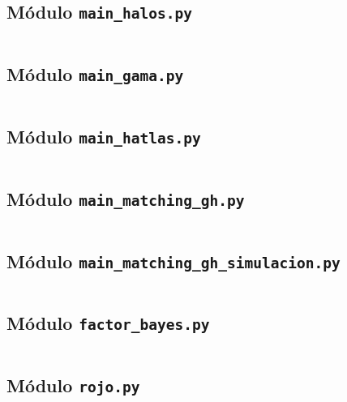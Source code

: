 \subsection{Módulo \texttt{main\_halos.py}}\label{apendice:codigo:main_halos}

\inputminted{python}{Apendices/codigo/main_halos.py}


\subsection{Módulo \texttt{main\_gama.py}}\label{apendice:codigo:main_gama}

\inputminted{python}{Apendices/codigo/main_gama.py}


\subsection{Módulo \texttt{main\_hatlas.py}}\label{apendice:codigo:main_hatlas}

\inputminted{python}{Apendices/codigo/main_hatlas.py}


\subsection{Módulo \texttt{main\_matching\_gh.py}}\label{apendice:codigo:main_matching_gh}

\inputminted{python}{Apendices/codigo/main_matching_gh.py}


\subsection{Módulo \texttt{main\_matching\_gh\_simulacion.py}}\label{apendice:codigo:main_matching_gh_simulacion}

\inputminted{python}{Apendices/codigo/main_matching_gh_simulacion.py}


\subsection{Módulo \texttt{factor\_bayes.py}}\label{apendice:codigo:factor_bayes}

\inputminted{python}{Apendices/codigo/factor_bayes.py}


\subsection{Módulo \texttt{rojo.py}}\label{apendice:codigo:rojo}

\inputminted{python}{Apendices/codigo/rojo.py}



